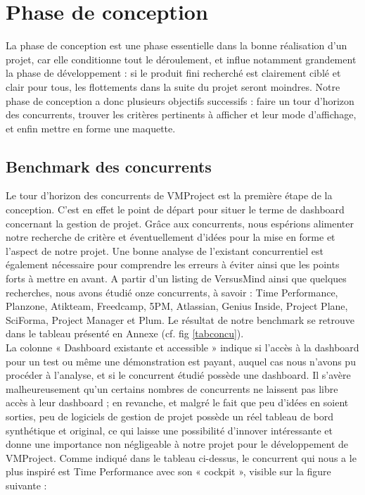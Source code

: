 \documentclass[12pt]{report}
\begin{document}
\chapter{Phase de conception}

La phase de conception est une phase essentielle dans la bonne réalisation d’un projet, car elle conditionne tout le déroulement, et influe notamment grandement la phase de développement : si le produit fini recherché est clairement ciblé et clair pour tous, les flottements dans la suite du projet seront moindres. Notre phase de conception a donc plusieurs objectifs successifs : faire un tour d’horizon des concurrents, trouver les critères pertinents à afficher et leur mode d’affichage, et enfin mettre en forme une maquette.\\

	\section{Benchmark des concurrents}

Le tour d’horizon des concurrents de VMProject est la première étape de la conception. C’est en effet le point de départ pour situer le terme de dashboard concernant la gestion de projet. Grâce aux concurrents, nous espérions alimenter notre recherche de critère et éventuellement d’idées pour la mise en forme et l’aspect de notre projet. Une bonne analyse de l’existant concurrentiel est également nécessaire pour comprendre les erreurs à éviter ainsi que les points forts à mettre en avant. A partir d’un listing de VersusMind ainsi que quelques recherches, nous avons étudié onze concurrents, à savoir : Time Performance, Planzone, Atikteam, Freedcamp, 5PM, Atlassian, Genius Inside, Project Plane, SciForma, Project Manager et Plum. Le résultat de notre benchmark se retrouve dans le tableau présenté en Annexe (cf. fig \ref{tabconcu}).\\

La colonne « Dashboard existante et accessible » indique si l’accès à la dashboard pour un test ou même une démonstration est payant, auquel cas nous n’avons pu procéder à l’analyse, et si le concurrent étudié possède une dashboard. Il s’avère malheureusement qu’un certains nombres de concurrents ne laissent pas libre accès à leur dashboard ; en revanche, et malgré le fait que peu d’idées en soient sorties, peu de logiciels de gestion de projet possède un réel tableau de bord synthétique et original, ce qui laisse une possibilité d’innover intéressante et donne une importance non négligeable à notre projet pour le développement de VMProject. Comme indiqué dans le tableau ci-dessus, le concurrent qui nous a le plus inspiré est Time Performance avec son « cockpit », visible sur la figure suivante : \\
\end{document}
